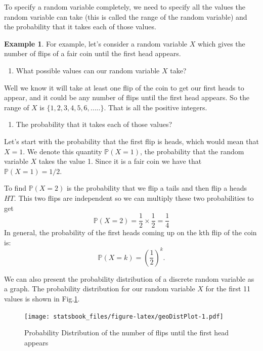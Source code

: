 \documentclass[
]{book}
\providecommand{\tightlist}{%
  \setlength{\itemsep}{0pt}\setlength{\parskip}{0pt}}
\newcommand{\prob}[1]{{\mathbb{P}(#1)}}
\theoremstyle{definition}
\theoremstyle{definition}
\newtheorem{example}{Example}[chapter]
\theoremstyle{definition}
\theoremstyle{definition}
\theoremstyle{remark}
\begin{document}
To specify a random variable completely, we need to specify all the values the random variable can take (this is called the range of the random variable) and the probability that it takes each of those values.

\begin{example}
\protect\hypertarget{exm:unnamed-chunk-254}{}\label{exm:unnamed-chunk-254}For example, let's consider a random variable \(X\) which gives the number of flips of a fair coin until the first head appears.

\begin{enumerate}
\def\labelenumi{\arabic{enumi}.}
\tightlist
\item
  What possible values can our random variable \(X\) take?
\end{enumerate}

Well we know it will take at least one flip of the coin to get our first heads to appear, and it could be any number of flips until the first head appears. So the range of \(X\) is \(\{1,2,3,4,5,6,.....\}\). That is all the positive integers.

\begin{enumerate}
\def\labelenumi{\arabic{enumi}.}
\setcounter{enumi}{1}
\tightlist
\item
  The probability that it takes each of those values?
\end{enumerate}

Let's start with the probability that the first flip is heads, which would mean that \(X=1\). We denote this quantity \(\prob{X=1}\), the probability that the random variable \(X\) takes the value 1. Since it is a fair coin we have that \(\prob{X=1}=1/2\).

To find \(\prob{X=2}\) is the probability that we flip a tails and then flip a heads \(HT\). This two flips are independent so we can multiply these two probabilities to get \[\prob{X=2}=\frac{1}{2} \times \frac{1}{2}=\frac{1}{4}\]
In general, the probability of the first heads coming up on the kth flip of the coin is:
\[\prob{X=k}=\left( \frac{1}{2} \right)^k.\]

We can also present the probability distribution of a discrete random variable as a graph. The probability distribution for our random variable \(X\) for the first 11 values is shown in Fig.\ref{fig:geoDistPlot}.
\end{example}

\begin{figure}
\centering
\texttt{[image: statsbook\_files/figure-latex/geoDistPlot-1.pdf]}
\caption{\label{fig:geoDistPlot}Probability Distribution of the number of flips until the first head appears}
\end{figure}
\end{document}
